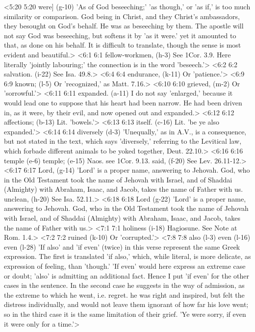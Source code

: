 <5:20 5:20  were] (g-10)  'As of God beseeching;' 'as though,' or 'as if,' is too much  similarity or comparison. God being in Christ, and they  Christ's ambassadors, they besought on God's behalf. He was as  beseeching by them. The apostle will not say God was  beseeching, but softens it by 'as it were.' yet it amounted to  that, as done on his behalf. It is difficult to translate,  though the sense is most evident and beautiful.>
<6:1 6:1  fellow-workmen, (h-3)  See 1Cor. 3.9. Here literally 'jointly labouring;' the  connection is in the word 'beseech.'>
<6:2 6:2  salvation. (i-22)  See Isa. 49.8.>
<6:4 6:4  endurance, (k-11)  Or 'patience.'>
<6:9 6:9  known; (l-5)  Or 'recognized,' as Matt. 7.16.>
<6:10 6:10  grieved, (m-2)  Or 'sorrowful.'>
<6:11 6:11  expanded. (a-11)  I do not say 'enlarged,' because it would lead one to suppose  that his heart had been narrow. He had been driven in, as it  were, by their evil, and now opened out and expanded.>
<6:12 6:12  affections; (b-13)  Lit. 'bowels.'>
<6:13 6:13  itself. (c-16)  Lit. 'be ye also expanded.'>
<6:14 6:14  diversely (d-3)  'Unequally,' as in A.V., is a consequence, but not stated in  the text, which says 'diversely,' referring to the Levitical  law, which forbade different animals to be yoked together,  Deut. 22.10.>
<6:16 6:16  temple (e-6)  temple; (e-15)
  Naos. see 1Cor. 9.13.
  said, (f-20)  See Lev. 26.11-12.>
<6:17 6:17  Lord, (g-14) 'Lord' is a proper name, answering to Jehovah. God, who in  the Old Testament took the name of Jehovah with Israel, and of  Shaddai (Almighty) with Abraham, Isaac, and Jacob, takes the  name of Father with us.
  unclean, (h-20)  See Isa. 52.11.>
<6:18 6:18  Lord (g-22)  'Lord' is a proper name, answering to Jehovah. God, who in  the Old Testament took the name of Jehovah with Israel, and of  Shaddai (Almighty) with Abraham, Isaac, and Jacob, takes the  name of Father with us.>
<7:1 7:1  holiness (i-18)  Hagiosune. See Note at Rom. 1.4.>
<7:2 7:2  ruined (k-10)  Or 'corrupted.'>
<7:8 7:8  also (l-3)  even (l-16)  even (l-28)
  'If also' and 'if even' (twice) in this verse represent the  same Greek expression. The first is translated 'if also,'  which, while literal, is more delicate, as expression of  feeling, than 'though.' 'If even' would here express an extreme  case or doubt; 'also' is admitting an additional fact. Hence I  put 'if even' for the other cases in the sentence. In the  second case he suggests in the way of admission, as the extreme  to which he went, i.e. regret. he was right and inspired, but  felt the distress individually, and would not leave them  ignorant of how far his love went; so in the third case it is  the same limitation of their grief. 'Ye were sorry, if even it  were only for a time.'>

